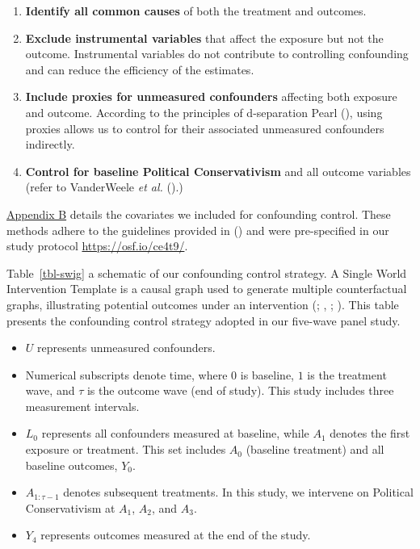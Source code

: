 \documentclass[
  single column]{article}
\providecommand{\tightlist}{%
  \setlength{\itemsep}{0pt}\setlength{\parskip}{0pt}}\usepackage{longtable,booktabs,array}
\begin{document}
\begin{enumerate}
\def\labelenumi{\arabic{enumi}.}
\tightlist
\item
  \textbf{Identify all common causes} of both the treatment and
  outcomes.
\item
  \textbf{Exclude instrumental variables} that affect the exposure but
  not the outcome. Instrumental variables do not contribute to
  controlling confounding and can reduce the efficiency of the
  estimates.
\item
  \textbf{Include proxies for unmeasured confounders} affecting both
  exposure and outcome. According to the principles of d-separation
  Pearl (), using proxies allows us to
  control for their associated unmeasured confounders indirectly.
\item
  \textbf{Control for baseline Political Conservativism} and all outcome
  variables (refer to VanderWeele \emph{et al.}
  ().)
\end{enumerate}

\hyperref[appendix-demographics]{Appendix B} details the covariates we
included for confounding control. These methods adhere to the guidelines
provided in () and
were pre-specified in our study protocol \url{https://osf.io/ce4t9/}.

Table~\ref{tbl-swig} a schematic of our confounding control strategy. A
Single World Intervention Template is a causal graph used to generate
multiple counterfactual graphs, illustrating potential outcomes under an
intervention (;
,
;
). This
table presents the confounding control strategy adopted in our five-wave
panel study.

\begin{itemize}
\tightlist
\item
  \(U\) represents unmeasured confounders.
\item
  Numerical subscripts denote time, where \(0\) is baseline, \(1\) is
  the treatment wave, and \(\tau\) is the outcome wave (end of study).
  This study includes three measurement intervals.
\item
  \(L_0\) represents all confounders measured at baseline, while \(A_1\)
  denotes the first exposure or treatment. This set includes \(A_0\)
  (baseline treatment) and all baseline outcomes, \(Y_0\).
\item
  \(A_{1:\tau - 1}\) denotes subsequent treatments. In this study, we
  intervene on Political Conservativism at \(A_1\), \(A_2\), and
  \(A_3\).
\item
  \(Y_4\) represents outcomes measured at the end of the study.
\end{itemize}
\end{document}
